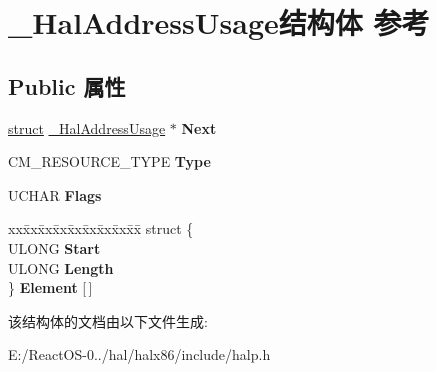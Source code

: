 \hypertarget{struct___hal_address_usage}{}\section{\+\_\+\+Hal\+Address\+Usage结构体 参考}
\label{struct___hal_address_usage}
\subsection*{Public 属性}
\begin{DoxyCompactItemize}
\item 
\mbox{\label{struct___hal_address_usage_a873617d83dced673413bbb7a77b060bb}} 
\hyperlink{interfacestruct}{struct} \hyperlink{struct___hal_address_usage}{\+\_\+\+Hal\+Address\+Usage} $\ast$ {\bfseries Next}
\item 
\mbox{\label{struct___hal_address_usage_a883f7ba7017c54f797c00ffa45d91882}} 
C\+M\+\_\+\+R\+E\+S\+O\+U\+R\+C\+E\+\_\+\+T\+Y\+PE {\bfseries Type}
\item 
\mbox{\label{struct___hal_address_usage_aa01ce6979973df37389bfebba7eaf196}} 
U\+C\+H\+AR {\bfseries Flags}
\item 
\mbox{\label{struct___hal_address_usage_a4a87f50e1577f0ef4bab914e384cee73}} 
\begin{tabbing}
xx\=xx\=xx\=xx\=xx\=xx\=xx\=xx\=xx\=\kill
struct \{\\
\>ULONG {\bfseries Start}\\
\>ULONG {\bfseries Length}\\
\} {\bfseries Element} \mbox{[}$\,$\mbox{]}\\

\end{tabbing}\end{DoxyCompactItemize}


该结构体的文档由以下文件生成\+:\begin{DoxyCompactItemize}
\item 
E\+:/\+React\+O\+S-\/0../hal/halx86/include/halp.\+h\end{DoxyCompactItemize}
